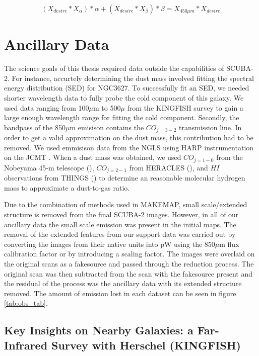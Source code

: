 \begin{table}[h]
\begin{equation} \label{eq:GBSmethod}
  \left(X_{desire} \ast X_{\alpha}\right)*\alpha + \left(X_{desire} \ast X_{\beta}\right)*\beta = X_{450\mu m} \ast X_{desire}
\end{equation}

\section{Ancillary Data}

The science goals of this thesis required data outside the capabilities of SCUBA-2.  For instance, accurtely determining the dust mass involved fitting the spectral energy distribution (SED) for NGC3627.  To successfully fit an SED, we needed shorter wavelength data to fully probe the cold component of this galaxy. We used data ranging from 100$\mu$m to 500$\mu$ from the KINGFISH survey \citet{kennicutt2011} to gain a large enough wavelength range for fitting the cold component.  Secondly, the bandpass of the 850$\mu$m emisison contains the $CO_{j=3-2}$ transmission line.  In order to get a valid approximation on the dust mass, this contribution had to be removed.  We used emmisison data from the NGLS using HARP instrumentation on the JCMT \citet{wilson2012}.  When a dust mass was obtained, we used $CO_{j=1-0}$ from the Nobeyama 45-m telescope (\citet{kuno2007}), $CO_{j=2-1}$ from HERACLES (\citet{leroy2009}), and $HI$ observations from THINGS (\citet{walter2008}) to determine an reasonable molecular hydrogen mass to approximate a dust-to-gas ratio.

Due to the combination of methods used in MAKEMAP, small scale/extended structure is removed from the final SCUBA-2 images.  However, in all of our ancillary data the small scale emission was present in the initial maps.  The removal of the extended features from our support data was carried out by converting the images from their native units into pW using the 850$\mu$m flux calibration factor or by introducing a scaling factor.  The images were overlaid on the original scans as a fakesource and passed through the reduction process.  The original scan was then subtracted from the scan with the fakesource present and the residual of the process was the ancillary data with its extended structure removed.  The amount of emission lost in each dataset can be seen in figure \ref{tab:obs_tab}.

\subsection{Key Insights on Nearby Galaxies: a Far-Infrared Survey with Herschel (KINGFISH)}


\end{table}
